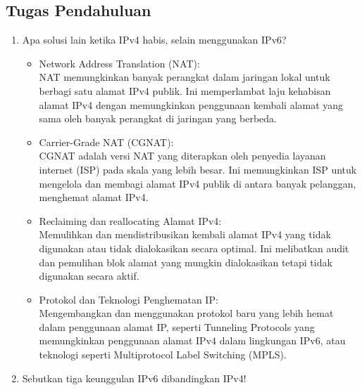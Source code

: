 \subsection{Tugas Pendahuluan}
\begin{enumerate}
	\item Apa solusi lain ketika IPv4 habis, selain menggunakan IPv6?
	
	\begin{itemize}
		\item Network Address Translation (NAT): \\ NAT memungkinkan banyak perangkat dalam jaringan lokal untuk berbagi satu alamat IPv4 publik. Ini memperlambat laju kehabisan alamat IPv4 dengan memungkinkan penggunaan kembali alamat yang sama oleh banyak perangkat di jaringan yang berbeda.
		\item Carrier-Grade NAT (CGNAT): \\ CGNAT adalah versi NAT yang diterapkan oleh penyedia layanan internet (ISP) pada skala yang lebih besar. Ini memungkinkan ISP untuk mengelola dan membagi alamat IPv4 publik di antara banyak pelanggan, menghemat alamat IPv4.
		\item Reclaiming dan reallocating Alamat IPv4: \\ Memulihkan dan mendistribusikan kembali alamat IPv4 yang tidak digunakan atau tidak dialokasikan secara optimal. Ini melibatkan audit dan pemulihan blok alamat yang mungkin dialokasikan tetapi tidak digunakan secara aktif.
		\item Protokol dan Teknologi Penghematan IP: \\ Mengembangkan dan menggunakan protokol baru yang lebih hemat dalam penggunaan alamat IP, seperti Tunneling Protocols yang memungkinkan penggunaan alamat IPv4 dalam lingkungan IPv6, atau teknologi seperti Multiprotocol Label Switching (MPLS).
	\end{itemize}

	\item Sebutkan tiga keunggulan IPv6 dibandingkan IPv4!
	

\end{enumerate}
